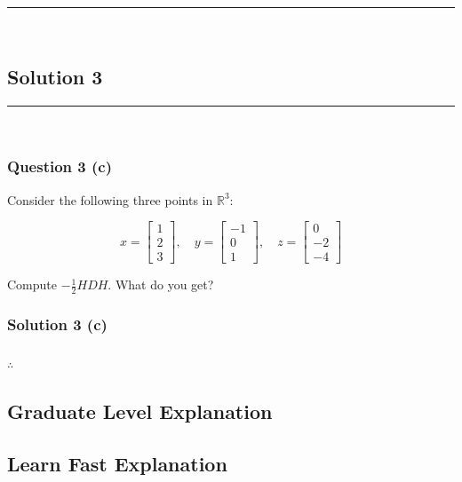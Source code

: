 \documentclass{article}
\begin{document}
\noindent\rule{\textwidth}{0.4pt}\\

\newpage

\subsection*{Solution 3}
\noindent\rule{\textwidth}{0.4pt}\\
\subsubsection*{Question 3 (c)}
\begin{flushleft}
    Consider the following three points in $\mathbb{R}^3$:

\[
x = \begin{bmatrix}1 \\ 2 \\ 3\end{bmatrix}, \quad
y = \begin{bmatrix}-1 \\ 0 \\ 1\end{bmatrix}, \quad
z = \begin{bmatrix}0 \\ -2 \\ -4\end{bmatrix}
\]

\end{flushleft}
\begin{flushleft}

Compute $-\frac{1}{2}HDH$. What do you get?
    
\end{flushleft}

\subsubsection*{Solution 3 (c)}


\subsubsection*{\normalfont}{$\therefore$ }

\subsection*{Graduate Level Explanation}

\subsection*{Learn Fast Explanation}
\end{document}
